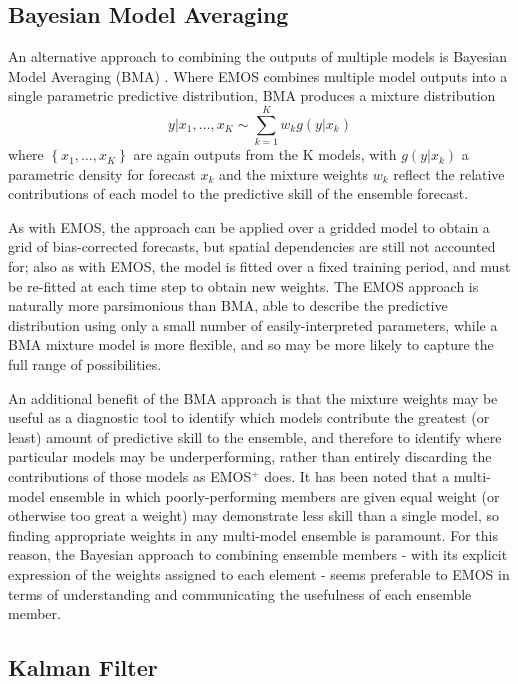 \documentclass[10pt,fleqn]{article}
\begin{document}
\subsection*{Bayesian Model Averaging}

An alternative approach to combining the outputs of multiple models is Bayesian Model Averaging (BMA) \cite{Raftery2005}. Where EMOS combines multiple model outputs into a single parametric predictive distribution, BMA produces a mixture distribution
\[ y | x_1, \dots, x_K \sim \sum_{k=1}^K w_k g(y | x_k) \]
where $\left\{ x_1, \dots, x_K \right\}$ are again outputs from the K models, with $g(y|x_k)$ a parametric density for forecast $x_k$ and the mixture weights $w_k$ reflect the relative contributions of each model to the predictive skill of the ensemble forecast.

As with EMOS, the approach can be applied over a gridded model to obtain a grid of bias-corrected forecasts, but spatial dependencies are still not accounted for; also as with EMOS, the model is fitted over a fixed training period, and must be re-fitted at each time step to obtain new weights. The EMOS approach is naturally more parsimonious than BMA, able to describe the predictive distribution using only a small number of easily-interpreted parameters, while a BMA mixture model is more flexible, and so may be more likely to capture the full range of possibilities. 

An additional benefit of the BMA approach is that the mixture weights may be useful as a diagnostic tool to identify which models contribute the greatest (or least) amount of predictive skill to the ensemble, and therefore to identify where particular models may be underperforming, rather than entirely discarding the contributions of those models as EMOS$^+$ does. It has been noted \cite{Hagedorn2012} that a multi-model ensemble in which poorly-performing members are given equal weight (or otherwise too great a weight) may demonstrate less skill than a single model, so finding appropriate weights in any multi-model ensemble is paramount. For this reason, the Bayesian approach to combining ensemble members - with its explicit expression of the weights assigned to each element - seems preferable to EMOS in terms of understanding and communicating the usefulness of each ensemble member.





\subsection*{Kalman Filter}
\end{document}
